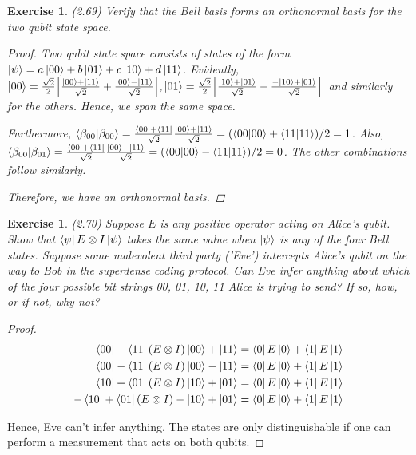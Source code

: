 \documentclass[11pt]{article}
\newcommand\0{\mathbf{0}}
\newcommand\<{\langle}
\renewcommand\>{\rangle}
\newtheorem{exercise}[theorem]{Exercise}
\begin{document}
\begin{exercise} 
(2.69) Verify that the Bell basis forms an orthonormal basis for the two qubit state space.

\begin{proof}
Two qubit state space consists of states of the form $\ket{\psi} = a\ket{00} + b\ket{01} + c \ket{10} + d\ket{11}$. Evidently, $\ket{00} = \frac{\sqrt{2}}{2}\Big[\frac{\ket{00} + \ket{11}}{\sqrt{2}} + \frac{\ket{00} - \ket{11}}{\sqrt{2}}\Big], \ket{01} = \frac{\sqrt{2}}{2}\Big[\frac{\ket{10} + \ket{01}}{\sqrt{2}} - \frac{-\ket{10} + \ket{01}}{\sqrt{2}}\Big]$ and similarly for the others. Hence, we span the same space.

Furthermore,  $\bra{\beta_{00}}\ket{\beta_{00}} = \frac{\bra{00} + \bra{11}}{\sqrt{2}}\frac{\ket{00} + \ket{11}}{\sqrt{2}} = (\bra{00}\ket{00} + \bra{11}\ket{11}) /2 = 1$. Also, $\bra{\beta_{00}}\ket{\beta_{01}} = \frac{\bra{00} + \bra{11}}{\sqrt{2}}\frac{\ket{00} - \ket{11}}{\sqrt{2}} = (\bra{00}\ket{00} - \bra{11}\ket{11})/2 = 0$. The other combinations follow similarly.

Therefore, we have an orthonormal basis. 
\end{proof}

\end{exercise}

\begin{exercise} 
(2.70) Suppose $E$ is any positive operator acting on Alice’s qubit. Show that $\bra{\psi} E \otimes I \ket{\psi}$ takes the same value when $\ket{\psi}$ is any of the four Bell states. Suppose some malevolent third party ('Eve') intercepts Alice’s qubit on the way to Bob in the superdense coding protocol. Can Eve infer anything about which of the four possible bit strings 00, 01, 10, 11 Alice is trying to send? If so, how, or if not, why not?	
\end{exercise}

\begin{proof}
\begin{align*}
	\bra{00} + \bra{11} (E \otimes I) \ket{00} + \ket{11} &= \bra{0}E\ket{0} + \bra{1}E\ket{1}\\
 	\bra{00} - \bra{11}(E \otimes I)\ket{00} - \ket{11}&= \bra{0}E\ket{0} + \bra{1}E\ket{1}\\
 	\bra{10} + \bra{01} (E \otimes I)\ket{10} + \ket{01} &= \bra{0}E\ket{0} + \bra{1}E\ket{1}\\
 	-\bra{10} + \bra{01}(E \otimes I)-\ket{10} + \ket{01} &= \bra{0}E\ket{0} + \bra{1}E\ket{1}\\
\end{align*}
	
	Hence, Eve can't infer anything. The states are only distinguishable if one can perform a measurement that acts on both qubits.  
\end{proof}
\end{document}
